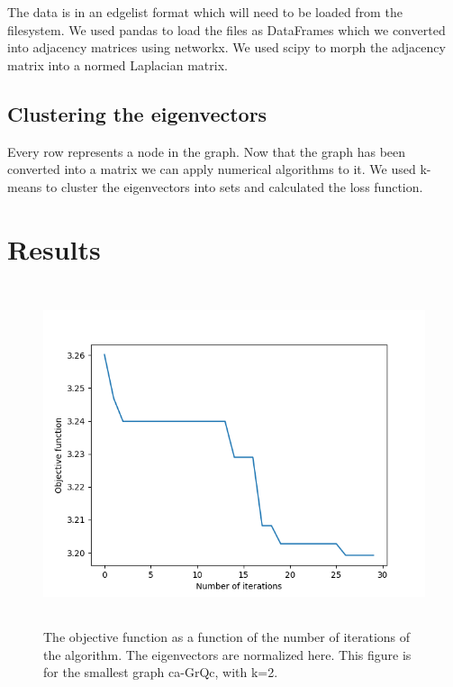 \documentclass{article}
\begin{document}
The data is in an edgelist format which will need to be loaded from the filesystem. We used pandas to load the files as DataFrames which we converted into adjacency matrices using networkx. We used scipy to morph the adjacency matrix into a normed Laplacian matrix.
	

\subsection{Clustering the eigenvectors}

Every row represents a node in the graph. Now that the graph has been converted into a matrix we can apply numerical algorithms to it. We used k-means to cluster the eigenvectors into sets and calculated the loss function.

\section{Results}

\begin{figure}[htb]
\begin{center} 
\includegraphics[height=10cm]{plot2.png}
\end{center}
\caption{The objective function as a function of the number of iterations of the algorithm.
The eigenvectors are normalized here. This figure is for the smallest graph ca-GrQc, with k=2.}
\label{plot1}
\end{figure}
\end{document}
